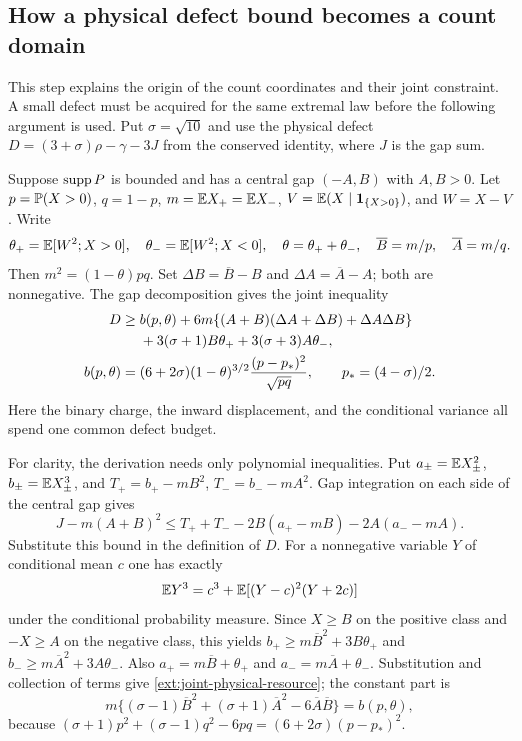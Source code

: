 \subsection{How a physical defect bound becomes a count domain}
\label{ext:physical-count-domain}
This step explains the origin of the count coordinates and their joint
constraint. A small defect must be acquired for the same extremal law
before the following argument is used. Put $\sigma=\sqrt{10}$ and use
the physical defect $D=(3+\sigma)\rho-\gamma-3J$ from the conserved
identity, where $J$ is the gap sum.

Suppose $\operatorname{supp} P$ is bounded and has a central gap $(-A,B)$ with
$A,B>0$. Let $p=\mathbb P(X>0)$, $q=1-p$, $m=\mathbb E X_+=\mathbb E X_-$,
$V=\mathbb E(X\mid\mathbf 1_{\{X>0\}})$, and $W=X-V$. Write
\[
 \theta_+=\mathbb E[W^2;X>0],\quad \theta_-=\mathbb E[W^2;X<0],
 \quad\theta=\theta_++\theta_-,\quad
 \overline B=m/p,\quad\overline A=m/q.
\]
Then $m^2=(1-\theta)pq$. Set
$\Delta B=\overline B-B$ and $\Delta A=\overline A-A$; both
are nonnegative. The gap decomposition gives the joint inequality
\begin{align}
 D\ge{}&b(p,\theta)
 +6m\{(A+B)(\Delta A+\Delta B)+\Delta A\Delta B\}
 \notag\\
 &+3(\sigma+1)B\theta_++3(\sigma+3)A\theta_-,
 \label{ext:joint-physical-resource}\\
 b(p,\theta)={}&
 (6+2\sigma)(1-\theta)^{3/2}
       \frac{(p-p_*)^2}{\sqrt{pq}},\qquad p_*=(4-\sigma)/2.
 \notag
\end{align}
Here the binary charge, the inward displacement, and the conditional
variance all spend one common defect budget.

For clarity, the derivation needs only polynomial inequalities. Put
$a_\pm=\mathbb E X_\pm^2$, $b_\pm=\mathbb E X_\pm^3$, and
$T_+=b_+-mB^2$, $T_-=b_--mA^2$. Gap integration on each
side of the central gap gives
\[
 J-m(A+B)^2\le
 T_++T_--2B(a_+-mB)-2A(a_--mA).
\]
Substitute this bound in the definition of $D$. For a nonnegative
variable $Y$ of conditional mean $c$ one has exactly
\[
 \mathbb E Y^3=c^3+\mathbb E[(Y-c)^2(Y+2c)]
\]
under the conditional probability measure. Since $X\ge B$ on the
positive class and $-X\ge A$ on the negative class, this yields
$b_+\ge m\overline B^2+3B\theta_+$ and
$b_-\ge m\overline A^2+3A\theta_-$. Also
$a_+=m\overline B+\theta_+$ and
$a_-=m\overline A+\theta_-$. Substitution and collection of terms
give \eqref{ext:joint-physical-resource}; the constant part is
\[
 m\{(\sigma-1)\overline B^2+(\sigma+1)\overline A^2
          -6\overline A\overline B\}=b(p,\theta),
\]
because $(\sigma+1)p^2+(\sigma-1)q^2-6pq
=(6+2\sigma)(p-p_*)^2$.

